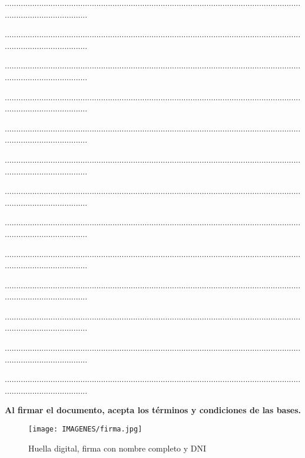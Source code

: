 \documentclass{article}
\begin{document}
.....................................................................................................................................................................

.....................................................................................................................................................................

.....................................................................................................................................................................

.....................................................................................................................................................................

.....................................................................................................................................................................

.....................................................................................................................................................................

.....................................................................................................................................................................

.....................................................................................................................................................................

.....................................................................................................................................................................

.....................................................................................................................................................................

.....................................................................................................................................................................

.....................................................................................................................................................................

.....................................................................................................................................................................


\textbf{Al firmar el documento, acepta los términos y condiciones de las bases.}

\begin{figure}[hbtp]
\centering
\texttt{[image: IMAGENES/firma.jpg]}
\caption{Huella digital, firma con nombre completo y DNI}
\end{figure}
\end{document}

